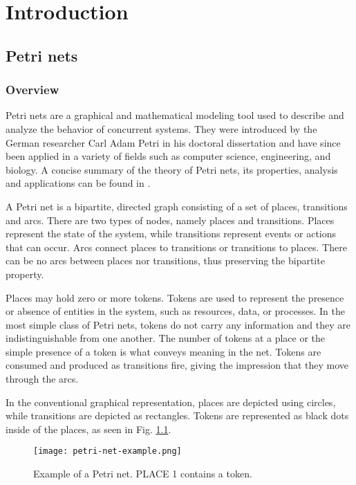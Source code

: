 \chapter{Introduction}

\section{Petri nets}

\subsection{Overview}

Petri nets are a graphical and mathematical modeling tool used to describe and analyze the behavior of concurrent systems.
They were introduced by the German researcher Carl Adam Petri in his doctoral dissertation \cite{petri1962}
and have since been applied in a variety of fields such as computer science, engineering, and biology.
A concise summary of the theory of Petri nets, its properties, analysis and applications can be found in \cite{murata1989}.

A Petri net is a bipartite, directed graph consisting of a set of places, transitions and arcs.
There are two types of nodes, namely places and transitions.
Places represent the state of the system, while transitions represent events or actions that can occur.
Arcs connect places to transitions or transitions to places.
There can be no arcs between places nor transitions, thus preserving the bipartite property.

Places may hold zero or more tokens.
Tokens are used to represent the presence or absence of entities in the system, such as resources, data, or processes.
In the most simple class of Petri nets, tokens do not carry any information and they are indistinguishable from one another.
The number of tokens at a place or the simple presence of a token is what conveys meaning in the net.
Tokens are consumed and produced as transitions fire, giving the impression that they move through the arcs.

In the conventional graphical representation, places are depicted using circles, while transitions are depicted as rectangles.
Tokens are represented as black dots inside of the places, as seen in Fig. \ref{fig:petri-net-example}.

\begin{figure}[H]
    \centering
    \texttt{[image: petri-net-example.png]}
    \caption{Example of a Petri net. \uppercase{PLACE 1} contains a token.}
    \label{fig:petri-net-example}
\end{figure}

